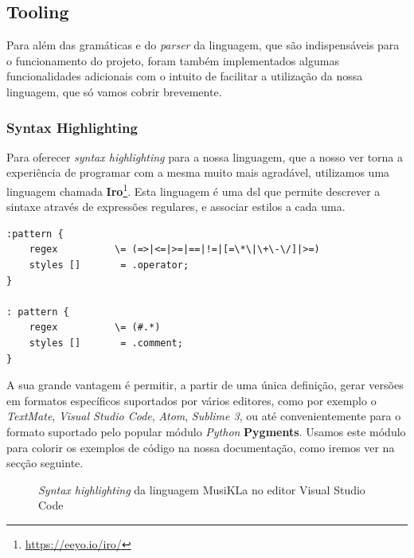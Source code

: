 \subsection{Tooling}
Para além das gramáticas e do \textit{parser} da linguagem, que são indispensáveis para o funcionamento do projeto, foram também implementados algumas funcionalidades adicionais com o intuito de facilitar a utilização da nossa linguagem, que só vamos cobrir brevemente.

\subsubsection{Syntax Highlighting}
Para oferecer \textit{syntax highlighting} para a nossa linguagem, que a nosso ver torna a experiência de programar com a mesma muito mais agradável, utilizamos uma linguagem chamada \textbf{Iro}\footnote{\url{https://eeyo.io/iro/}}. Esta linguagem é uma \acrshort{dsl} que permite descrever a sintaxe através de expressões regulares, e associar estilos a cada uma. 

\begin{lstlisting}[caption={Pequeno excerto da definição da linguagem escrito em Iro}]
:pattern {
    regex          \= (=>|<=|>=|==|!=|[=\*\|\+\-\/]|>=)
    styles []       = .operator;
}

: pattern {
    regex          \= (#.*)
    styles []       = .comment;
}
\end{lstlisting}

A sua grande vantagem é permitir, a partir de uma única definição, gerar versões em formatos específicos suportados por vários editores, como por exemplo o \textit{TextMate}, \textit{Visual Studio Code}, \textit{Atom}, \textit{Sublime 3}, ou até convenientemente para o formato suportado pelo popular módulo \textit{Python} \textbf{Pygments}. Usamos este módulo para colorir os exemplos de código na nossa documentação, como iremos ver na secção seguinte.


\begin{figure}[ht]
  \centering
  {%
  \setlength{\fboxsep}{0pt}%
  \setlength{\fboxrule}{0pt}%
  }%
  \caption{\textit{Syntax highlighting} da linguagem MusiKLa no editor Visual Studio Code}
  \label{fig:syntax-highlighting-code}
\end{figure}

